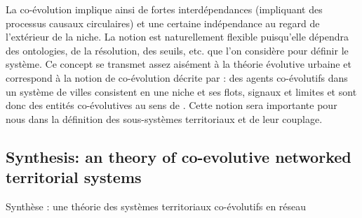 { La co-évolution implique ainsi de fortes interdépendances (impliquant des processus causaux circulaires) et une certaine indépendance au regard de l'extérieur de la niche. La notion est naturellement flexible puisqu'elle dépendra des ontologies, de la résolution, des seuils, etc. que l'on considère pour définir le système. Ce concept se transmet assez aisément
  à la théorie évolutive urbaine et correspond à la notion de co-évolution décrite par  : des agents co-évolutifs dans un système de villes consistent en une niche et ses flots, signaux et limites et sont donc des entités co-évolutives au sens de . Cette notion sera importante pour nous dans la définition des sous-systèmes territoriaux et de leur couplage.
}







\subsection{Synthesis: an theory of co-evolutive networked territorial systems}{Synthèse : une théorie des systèmes territoriaux co-évolutifs en réseau}





